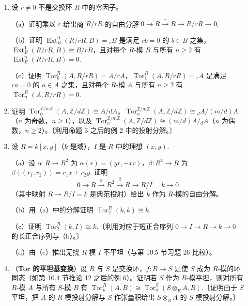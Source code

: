 \begin{enumerate}
\item 设 \(r \neq 0\) 不是交换环 \(R\) 中的零因子。

（a）证明乘以 \(r\) 给出商 \(R/rR\) 的自由分解 \(0 \to R \xrightarrow{r} R \to R/rR \to 0\).

（b）证明 \(\operatorname{Ext}_R^0(R/rR, B) = {}_rB\) 是满足 \(rb = 0\) 的 \(b \in B\) 之集，\(\operatorname{Ext}_R^1(R/rR, B) \cong B/rB\)，且对每个 \(R\)-模 \(B\) 与所有 \(n \geq 2\) 有 \(\operatorname{Ext}_R^n(R/rR, B) = 0\).

（c）证明 \(\operatorname{Tor}_0^R(A, R/rR) = A/rA\)，\(\operatorname{Tor}_1^R(A, R/rR) = {}_rA\) 是满足 \(ra = 0\) 的 \(a \in A\) 之集，且对每个 \(R\)-模 \(A\) 与所有 \(n \geq 2\) 有 \(\operatorname{Tor}_n^R(A, R/rR) = 0\).

\item 证明 \(\operatorname{Tor}_0^{\mathbb{Z}/m\mathbb{Z}}(A, \mathbb{Z}/d\mathbb{Z}) \cong A/dA\)，\(\operatorname{Tor}_n^{\mathbb{Z}/m\mathbb{Z}}(A, \mathbb{Z}/d\mathbb{Z}) \cong {}_dA/(m/d)A\)（\(n\) 为奇数，\(n \geq 1\)），以及 \(\operatorname{Tor}_n^{\mathbb{Z}/m\mathbb{Z}}(A, \mathbb{Z}/d\mathbb{Z}) \cong (m/d)A/{}_dA\)（\(n\) 为偶数，\(n \geq 2\)）。〔利用命题 3 之后的例 2 中的投射分解。〕

\item 设 \(R = k[x,y]\)（\(k\) 是域），\(I\) 是 \(R\) 中的理想 \((x,y)\).

（a）设 \(\alpha : R \to R^2\) 为 \(\alpha(r) = (yr, -xr)\)，\(\beta : R^2 \to R\) 为 \(\beta((r_1,r_2)) = r_1x+r_2y\). 证明
\[
0 \to R \xrightarrow{\alpha} R^2 \xrightarrow{\beta} R \to R/I = k \to 0
\]
（其中映射 \(R \to R/I = k\) 是典范投射）给出 \(k\) 作为 \(R\)-模的自由分解。

（b）用（a）中的分解证明 \(\operatorname{Tor}_2^R(k, k) \cong k\).

（c）证明 \(\operatorname{Tor}_2^R(k, I) \cong k\).〔利用对应于短正合序列 \(0 \to I \to R \to k \to 0\) 的长正合序列与（b）。〕

（d）由（c）推出无挠 \(R\)-模 \(I\) 不平坦（与第 10.5 节习题 26 比较）。

\item （\textbf{Tor 的平坦基变换}）设 \(R\) 与 \(S\) 是交换环，\(f : R \to S\) 是使 \(S\) 成为 \(R\)-模的环同态（如第 10.4 节推论 12 之后的例 6）。证明若 \(S\) 作为 \(R\)-模平坦，则对所有 \(R\)-模 \(A\) 与所有 \(S\)-模 \(B\) 有 \(\operatorname{Tor}_n^R(A, B) \cong \operatorname{Tor}_n^S(S \otimes_RA, B)\).〔证明由于 \(S\) 平坦，把 \(A\) 的 \(R\)-模投射分解与 \(S\) 作张量积给出 \(S \otimes_RA\) 的 \(S\)-模投射分解。〕


\end{enumerate}
